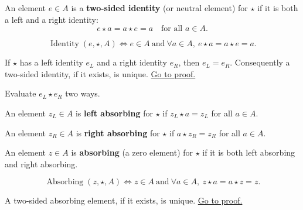 \begin{definition}
\label{def:identity}
An element $e\in A$ is a \textbf{two-sided identity} (or neutral element)
for $\star$ if it is both a left and a right identity:
\[
  e\star a=a\star e=a\quad\text{for all }a\in A.
\]
\end{definition}

\begin{remark*}
\[
\operatorname{Identity}(e,\star,A)\Longleftrightarrow
e\in A\ \text{and}\ \forall a\in A,\ e\star a=a\star e=a.
\]
\end{remark*}

\begin{proposition}
\label{prop:identity-collapse}
If $\star$ has a left identity $e_L$ and a right identity $e_R$, then
$e_L=e_R$. Consequently a two-sided identity, if it exists, is unique.
\hyperref[prf:identity-collapse]{Go to proof.}
\end{proposition}

\begin{remark*}
Evaluate $e_L\star e_R$ two ways.
\end{remark*}

\begin{definition}
\label{def:left-absorbing}
An element $z_L\in A$ is \textbf{left absorbing} for $\star$ if
$z_L\star a=z_L$ for all $a\in A$.
\end{definition}

\begin{definition}
\label{def:right-absorbing}
An element $z_R\in A$ is \textbf{right absorbing} for $\star$ if
$a\star z_R=z_R$ for all $a\in A$.
\end{definition}

\begin{definition}
\label{def:absorbing}
An element $z\in A$ is \textbf{absorbing} (a zero element) for $\star$ if it
is both left absorbing and right absorbing.
\end{definition}

\begin{remark*}
\[
\operatorname{Absorbing}(z,\star,A)\Longleftrightarrow
z\in A\ \text{and}\ \forall a\in A,\ z\star a=a\star z=z.
\]
\end{remark*}

\begin{proposition}
\label{prop:absorbing-unique}
A two-sided absorbing element, if it exists, is unique.
\hyperref[prf:absorbing-unique]{Go to proof.}
\end{proposition}

